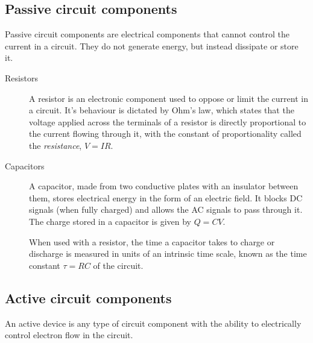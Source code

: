\begin{refsection}
\begin{imp}
\begin{minipage}{0.5\textwidth}
\end{minipage}

\end{imp}

\subsection*{Passive circuit components}

Passive circuit components are electrical components that cannot control the current in a circuit. They do not generate energy, but instead dissipate or store it.

\begin{description}
\item[Resistors] A resistor is an electronic component used to oppose or limit the current in a circuit. It's behaviour is dictated by Ohm’s law, which states that the voltage applied across the terminals of a resistor is directly proportional to the current flowing through it, with the constant of proportionality called the \textit{resistance}, $V=IR$.


\item[Capacitors]

A capacitor, made from two conductive plates with an insulator between them, stores electrical energy in the form of an electric field. It blocks DC signals (when fully charged) and allows the AC signals to pass through it. The charge stored in a capacitor is given by $Q=CV$.


When used with a resistor, the time a capacitor takes to charge or discharge is measured in units of an intrinsic time scale, known as the time constant $\tau = RC$ of the circuit.

\end{description}



\subsection*{Active circuit components}
An active device is any type of circuit component with the ability to electrically control electron flow in the circuit.


\end{refsection}
